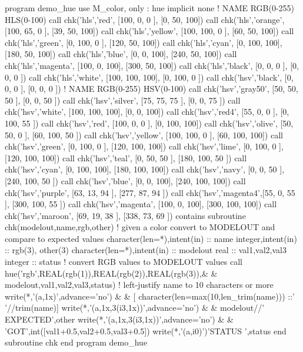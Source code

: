 \begin{DoxyDescription}
\begin{DoxyPre}    program demo\_hue
    use M\_color, only : hue
    implicit none
       !               NAME        RGB(0-255)            HLS(0-100)
       call chk('hls','red',     [100, 0,   0  ], [0,   50,  100])
       call chk('hls','orange',  [100, 65,  0  ], [39,  50,  100])
       call chk('hls','yellow',  [100, 100, 0  ], [60,  50,  100])
       call chk('hls','green',   [0,   100, 0  ], [120, 50,  100])
       call chk('hls','cyan',    [0,   100, 100], [180, 50,  100])
       call chk('hls','blue',    [0,   0,   100], [240, 50,  100])
       call chk('hls','magenta', [100, 0,   100], [300, 50,  100])
       call chk('hls','black',   [0,   0,   0  ], [0,   0,   0  ])
       call chk('hls','white',   [100, 100, 100], [0,   100, 0  ])
       call chk('hsv','black',   [0,   0,   0  ], [0,   0,   0  ])
       !               NAME        RGB(0-255)           HSV(0-100)
       call chk('hsv','gray50',  [50,  50,  50 ], [0,   0,   50 ])
       call chk('hsv','silver',  [75,  75,  75 ], [0,   0,   75 ])
       call chk('hsv','white',   [100, 100, 100], [0,   0,   100])
       call chk('hsv','red4',    [55,  0,   0  ], [0,   100, 55 ])
       call chk('hsv','red',     [100, 0,   0  ], [0,   100, 100])
       call chk('hsv','olive',   [50,  50,  0  ], [60,  100, 50 ])
       call chk('hsv','yellow',  [100, 100, 0  ], [60,  100, 100])
       call chk('hsv','green',   [0,   100, 0  ], [120, 100, 100])
       call chk('hsv','lime',    [0,   100, 0  ], [120, 100, 100])
       call chk('hsv','teal',    [0,   50,  50 ], [180, 100, 50 ])
       call chk('hsv','cyan',    [0,   100, 100], [180, 100, 100])
       call chk('hsv','navy',    [0,   0,   50 ], [240, 100, 50 ])
       call chk('hsv','blue',    [0,   0,   100], [240, 100, 100])
       call chk('hsv','purple',  [63,  13,  94 ], [277, 87,  94 ])
       call chk('hsv','magenta4',[55,  0,   55 ], [300, 100, 55 ])
       call chk('hsv','magenta', [100, 0,   100], [300, 100, 100])
       call chk('hsv','maroon',  [69,  19,  38 ], [338, 73,  69 ])
    contains
    subroutine chk(modelout,name,rgb,other)
    ! given a color convert to MODELOUT and compare to expected values
    character(len=*),intent(in)   :: name
    integer,intent(in)            :: rgb(3), other(3)
    character(len=*),intent(in)   :: modelout
       real                       :: val1,val2,val3
       integer                    :: status
       ! convert RGB values to MODELOUT values
       call hue('rgb',REAL(rgb(1)),REAL(rgb(2)),REAL(rgb(3)),\&
       \& modelout,val1,val2,val3,status)
          ! left-justify name to 10 characters or more
          write(*,'(a,1x)',advance='no') \&
          \& [ character(len=max(10,len\_trim(name))) ::' '//trim(name)]
          write(*,'(a,1x,3(i3,1x))',advance='no') \&
          \& modelout//' EXPECTED',other
          write(*,'(a,1x,3(i3,1x))',advance='no') \&
          \& 'GOT',int([val1+0.5,val2+0.5,val3+0.5])
          write(*,'(a,i0)')'STATUS ',status
    end subroutine chk
    end program demo\_hue\end{DoxyPre}




\end{DoxyDescription}
